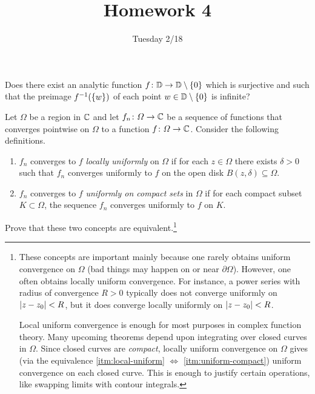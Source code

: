 \documentclass{../math135}
\title{Homework 4}
\author{}
\date{Tuesday 2/18}
\begin{document}
\begin{exercise}
	Does there exist an analytic function
  \(f \colon \DD \to \DD \setminus \set 0\) which is surjective and
  such that the preimage \(f^{-1}(\set w)\) of each point
  \(w \in \DD \setminus \set 0\) is infinite?

  \begin{solution}

  \end{solution}
\end{exercise}

\begin{exercise}
	Let \(\Omega\) be a region in \(\CC\) and let
  \(f_n \colon \Omega\to\CC\) be a sequence of functions that
  converges pointwise on \(\Omega\) to a function
  \(f \colon \Omega\to\CC\).  Consider the following definitions.
	\begin{enumerate}
  \item \(f_n\) converges to \(f\) \emph{locally uniformly} on
    \(\Omega\) if for each \(z \in \Omega\) there exists
    \(\delta > 0\) such that \(f_n\) converges uniformly to \(f\) on
    the open disk \(B(z, \delta) \subseteq \Omega\).
    \label{itm:local-uniform}
  \item \(f_n\) converges to \(f\) \emph{uniformly on compact sets} in
    \(\Omega\) if for each compact subset \(K \subset \Omega\), the
    sequence \(f_n\) converges uniformly to \(f\) on \(K\).
    \label{itm:uniform-compact}
	\end{enumerate}
	Prove that these two concepts are equivalent.\footnote{These
    concepts are important mainly because one rarely obtains uniform
    convergence on \(\Omega\) (bad things may happen on or near
    \(\partial\Omega\)).  However, one often obtains locally uniform
    convergence.  For instance, a power series with radius of
    convergence \(R > 0\) typically does not converge uniformly on
    \(\abs*{z-z_0} < R\), but it does converge locally uniformly on
    \(\abs*{z-z_0} < R\).

		Local uniform convergence is enough for most purposes in complex
    function theory.  Many upcoming theorems depend upon integrating
    over closed curves in \(\Omega\).  Since closed curves are
    \emph{compact}, locally uniform convergence on \(\Omega\) gives
    (via the equivalence \ref{itm:local-uniform} \(\iff\)
    \ref{itm:uniform-compact}) uniform convergence on each closed
    curve.  This is enough to justify certain operations, like
    swapping limits with contour integrals.}

  \begin{solution}

  \end{solution}

\end{exercise}
\end{document}
